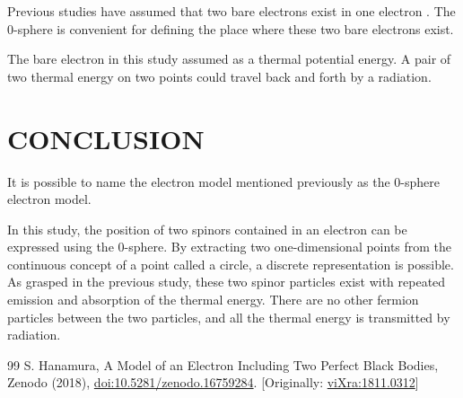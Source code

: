 \documentclass[
 reprint,
 amsmath,amssymb,
 aps,
]{revtex4-1}
\numberwithin{equation}{section}%
\begin{document}
    Previous studies have assumed that two bare electrons exist in one electron \cite{Hanamura}. The 0-sphere is convenient for defining the place where these two bare electrons exist.

    The bare electron in this study assumed as a thermal potential energy. A pair of two thermal energy on two points could travel back and forth by a radiation. 




\section{\label{sec:CONCLUSION}CONCLUSION}

    It is possible to name the electron model mentioned previously as the 0-sphere electron model.
    
    In this study, the position of two spinors contained in an electron can be expressed using the 0-sphere. By extracting two one-dimensional points from the continuous concept of a point called a circle, a discrete representation is possible. As grasped in the previous study, these two spinor particles exist with repeated emission and absorption of the thermal energy. There are no other fermion particles between the two particles, and all the thermal energy is transmitted by radiation.


\begin{thebibliography}{99}
     S. Hanamura, A Model of an Electron Including Two Perfect Black Bodies, Zenodo (2018), 
    \href{https://doi.org/10.5281/zenodo.16759284}{doi:10.5281/zenodo.16759284}. [Originally: 
    \href{http://vixra.org/abs/1811.0312}{viXra:1811.0312}]
\end{thebibliography}

\clearpage
\end{document}
